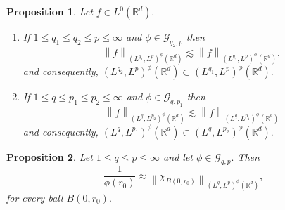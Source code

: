 \documentclass[10pt,a4paper]{amsart}
\newtheorem{proposition}{Proposition}
\begin{document}
 \begin{proposition}\label{prop 1}
 Let  $ f \in L^{0}(\mathbb{R}^{d}). $    
 \begin{enumerate}
 \item If $1\leq q_{1}\leq q_{2} \leq p \leq\infty$ and $ \phi \in \mathcal{G}_{q_{2},p} $ then 
 $$\left\| f \right\|_{(L^{q_{1}},L^{p})^{\phi }(\mathbb{R}^{d})} \lesssim \left\|f\right\|_{(L^{q_{2}},L^{p})^{\phi }(\mathbb{R}^{d})},$$ and consequently, $(L^{q_{2}},L^{p})^{\phi}(\mathbb{R}^{d})\subset (L^{q_{1}},L^{p})^{\phi}(\mathbb{R}^{d}).$
 \item If $1\leq q\leq p_{1} \leq p_{2} \leq\infty$ and $ \phi \in \mathcal{G}_{q,p_{1}} $ then 
 $$\left\| f \right\|_{(L^{q},L^{p_{2}})^{\phi}(\mathbb{R}^{d})} \lesssim \left\|f\right\|_{(L^{q},L^{p_{1}})^{\phi}(\mathbb{R}^{d})}$$ and consequently, $(L^{q},L^{p_{1}})^{\phi}(\mathbb{R}^{d})\subset (L^{q},L^{p_{2}})^{\phi}(\mathbb{R}^{d}).$
 \end{enumerate}
 \end{proposition}

\begin{proposition}
 Let $1\leq q \leq  p \leq \infty$ and let $ \phi \in \mathcal{G}_{q,p}. $ Then 
 $$\frac{1}{\phi(r_{0})} \approx \left\| \chi_{B(0,r_{0})} \right\|_{(L^{q},L^{p})^{\phi }(\mathbb{R}^{d})}, $$ for every ball $ B(0,r_{0}). $
 \end{proposition}
\end{document}
